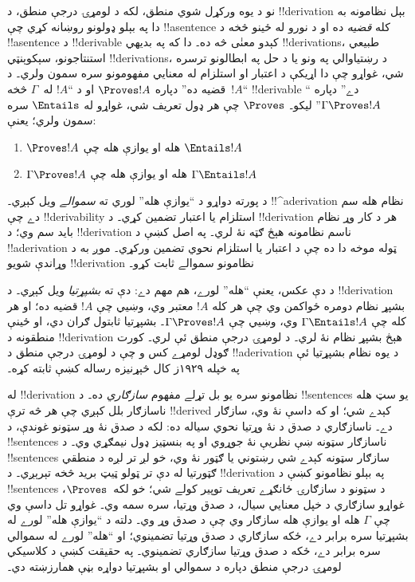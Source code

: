 \documentclass[../../../include/open-logic-section]{subfiles}
\begin{document}
نو د يوه ورکړل شوي منطق، لکه د لومړۍ درجې منطق، د !!{derivation}
بېل نظامونه به دا په بېلو ډولونو روښانه کړي چې !!a{sentence} کله
\emph{قضيه} ده او د نورو له ځينو څخه د !!a{sentence} د
!!{derivable} کېدو معنٰی څه ده۔ دا که په بديهي !!{derivation}s،
طبيعي استنتاجونو، سېکوېنټي !!{derivation}s، د رښتياوالي په ونو يا د
حل په ابطالونو ترسره شي، غواړو چې دا اړيکې د اعتبار او استلزام له
معنايي مفهومونو سره سمون ولري۔ د ``$!A$~قضيه ده'' دپاره
$\Proves !A$ او د ``$!A$ له~$\Gamma$ څخه !!{derivable} دے'' دپاره
``$\Gamma \Proves !A$'' ليکو۔ $\Proves$ چې هر ډول تعريف شي، غواړو
له $\Entails$ سره سمون ولري؛ يعنې:
\begin{enumerate}
\item $\Proves !A$ هله او يوازې هله چې $\Entails !A$
\item $\Gamma \Proves !A$ هله او يوازې هله چې $\Gamma \Entails !A$
\end{enumerate}
د پورته دواړو د ``يوازې هله'' لوري ته \emph{سموالے} ويل کېږي۔
!!^a{derivation} نظام هله سم دے چې !!{derivability} استلزام يا اعتبار
تضمين کړي۔ د !!{derivation} هر د کار وړ نظام بايد سم وي؛ د
!!{derivation} ناسم نظامونه هېڅ ګټه نۀ لري۔ په اصل کښې د
!!a{derivation} ټوله موخه دا ده چې د اعتبار يا استلزام نحوي تضمين
ورکړي۔ موږ به د وړاندې شويو !!{derivation} نظامونو سموالے ثابت کړو۔

د دې عکس، يعنې ``هله'' لورے، هم مهم دے: دې ته \emph{بشپړتيا} ويل
کېږي۔ د !!{derivation} بشپړ نظام دومره ځواکمن وي چې هر کله $!A$
معتبر وي، وښيي چې $!A$ قضيه ده؛ او هر کله چې
$\Gamma \Entails !A$ وي، وښيي چې $\Gamma \Proves !A$۔ بشپړتيا ثابتول
ګران دي، او ځينې منطقونه د !!{derivation} هېڅ بشپړ نظام نۀ لري۔ د
لومړۍ درجې منطق ئې لري۔ کورت ګوډل لومړے کس و چې د لومړۍ درجې منطق د
!!a{derivation} د يوه نظام بشپړتيا ئې په خپله ۱۹۲۹ز کال څېړنيزه
رساله کښې ثابته کړه۔

له !!{derivation} نظامونو سره يو بل تړلے مفهوم \emph{سازګاري} ده۔
د !!{sentence}s يو سټ هله ناسازګار بلل کېږي چې هر څه ترې
!!{derive}d کېدے شي؛ او که داسې نۀ وي، سازګار دے۔ ناسازګاري د صدق
د نۀ وړتيا نحوي سياله ده: لکه د صدق نۀ وړ سټونو غوندې، د
!!{sentence}s ناسازګار سټونه ښې نظريې نۀ جوړوي او په بنسټيز ډول
نيمګړي وي۔ د !!{sentence}s سازګار سټونه کېدے شي رښتوني يا ګټور نۀ
وي، خو لږ تر لږه د منطقي ګټورتيا له دې تر ټولو ټيټ بريد څخه تېرېږي۔
د !!{derivation} په بېلو نظامونو کښې د !!{sentence}s د سټونو د
سازګارۍ ځانګړے تعريف توپير کولے شي؛ خو لکه~$\Proves$، غواړو
سازګاري د خپل معنايي سيال، د صدق وړتيا، سره سمه وي۔ غواړو تل داسې
وي چې $\Gamma$ هله او يوازې هله سازګار وي چې د صدق وړ وي۔ دلته د
``يوازې هله'' لورے له بشپړتيا سره برابر دے، ځکه سازګاري د صدق
وړتيا تضمينوي؛ او ``هله'' لورے له سموالي سره برابر دے، ځکه د صدق
وړتيا سازګاري تضمينوي۔ په حقيقت کښې د کلاسيکي لومړۍ درجې منطق
دپاره د سموالي او بشپړتيا دواړه بڼې همارزښته دي۔
\end{document}
